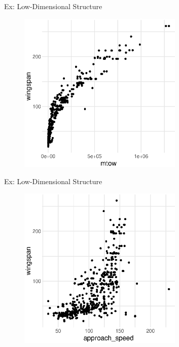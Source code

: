 \documentclass[14pt]{beamer}
\begin{document}
\begin{frame}{Ex: Low-Dimensional Structure}
  \begin{figure}
    \centering\includegraphics[width=0.7\textwidth]{./images/faa_wingspan_v_mtow}
  \end{figure}
\end{frame}

\begin{frame}{Ex: Low-Dimensional Structure}
  \begin{figure}
    \centering\includegraphics[width=0.7\textwidth]{./images/faa_wingspan_v_approach_speed}
  \end{figure}
\end{frame}
\end{document}
